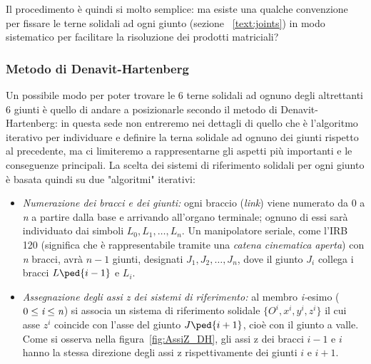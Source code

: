 Il procedimento è quindi si molto semplice: ma esiste una qualche convenzione per fissare le terne solidali ad ogni giunto (sezione ~\vref{text:joints}) in modo sistematico per facilitare la risoluzione dei prodotti matriciali?

\subsubsection{Metodo di Denavit-Hartenberg}\label{subsubsection:D-H}
Un possibile modo per poter trovare le 6 terne solidali ad ognuno degli altrettanti 6 giunti è quello di andare a posizionarle secondo il metodo di Denavit-Hartenberg: in questa sede non entreremo nei dettagli di quello che è l'algoritmo iterativo per individuare e definire la terna solidale ad ognuno dei giunti rispetto al precedente, ma ci limiteremo a rappresentarne gli aspetti più importanti e le conseguenze principali.
\newpage
La scelta dei sistemi di riferimento solidali per ogni giunto è basata quindi su due "algoritmi" iterativi:
\begin{itemize}
	\item \emph{Numerazione dei bracci e dei giunti:} ogni braccio (\emph{link}) viene numerato da 0 a \emph{n} a partire dalla base e arrivando all'organo terminale; ognuno di essi sarà individuato dai simboli $L_0,L_1,\dots,L_n$. Un manipolatore seriale, come l'IRB 120 (significa che è rappresentabile tramite una \emph{catena cinematica aperta}) con \emph{n} bracci, avrà $n-1$ giunti, designati $J_1,J_2,\dots,J_n$, dove il giunto $J_i$ collega i bracci $L\ped{i-1}$ e $L_i$.
	\item \emph{Assegnazione degli assi z dei sistemi di riferimento:} al membro \emph{i-}esimo ($0\le\emph{i}\le\emph{n}$) si associa un sistema di riferimento solidale $\{O^i,x^i,y^i,z^i\}$ il cui asse $z^i$ coincide con l'asse del giunto $J\ped{i+1}$, cioè con il giunto a valle. Come si osserva nella figura~\vref{fig:AssiZ_DH}, gli assi z dei bracci $i-1$ e $i$ hanno la stessa direzione degli assi z rispettivamente dei giunti $i$ e $i+1$.
\end{itemize}


